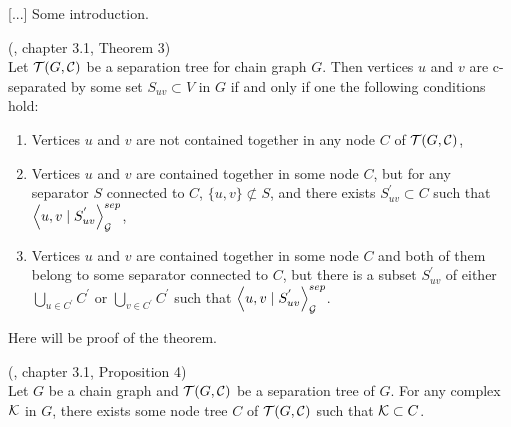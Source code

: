 %
%

[...] Some introduction.


\begin{thm} \label{LCDSkeletonThm} (\cite{CG}, chapter 3.1, Theorem 3) \\ 
	Let $\mathcal{T}(G, \mathcal{C})$ be a separation tree for chain graph $G$. Then vertices $u$ and $v$ are 
	c-separated by some set $S_{uv} \subset V$ in $G$ if and only if one the following conditions hold:
	
	\begin{enumerate}
		\item Vertices $u$ and $v$ are not contained together in any node $C$ of $\mathcal{T}(G, \mathcal{C})$,
		
		\item Vertices $u$ and $v$ are contained together in some node $C$, but for any separator $S$ connected
		to $C$, $\{u, v \} \not \subset S$, and there exists $S_{uv}^{'} \subset C$ such 
		that $\left\langle u , v \mid S_{uv}^{'} \right\rangle_{\mathcal{G}}^{sep}$,
		
		\item Vertices $u$ and $v$ are contained together in some node $C$ and both of them belong to some separator
		connected to $C$, but there is a subset $S_{uv}^{'}$ of either $\bigcup_{u \in C^{'}} C^{'}$ or
		$\bigcup_{v \in C^{'}} C^{'}$ such that $\left\langle u , v \mid S_{uv}^{'} \right\rangle_{\mathcal{G}}^{sep}$.
	\end{enumerate}
\end{thm}

\begin{prf}
	Here will be proof of the theorem.
	\QED
\end{prf}

 
\begin{prop} \label{LCDComplexProp} (\cite{CG}, chapter 3.1, Proposition 4) \\
	Let $G$ be a chain graph and $\mathcal{T}(G, \mathcal{C})$ be a separation tree of $G$. For any complex $\mathcal{K}$ in $G$, there
	exists some node tree $C$ of $\mathcal{T}(G, \mathcal{C})$ such that $\mathcal{K} \subset C$.
\end{prop}

